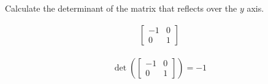 Calculate the determinant of the matrix that reflects over the $y$ axis.

\begin{align*}
    \begin{bmatrix}
        -1 & 0 \\
        0 & 1
    \end{bmatrix}
\end{align*}

\begin{solution}
\begin{align*}
    \det \left( \begin{bmatrix}
        -1 & 0 \\
        0 & 1
    \end{bmatrix} \right) = -1
\end{align*}
\end{solution}